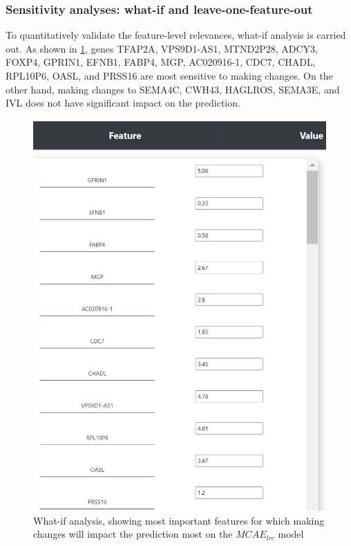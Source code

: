 \subsubsection{Sensitivity analyses: what-if and leave-one-feature-out}
To quantitatively validate the feature-level relevances, what-if analysis is carried out. As shown in \cref{fig:what_if}, genes TFAP2A, VPS9D1-AS1, MTND2P28, ADCY3, FOXP4, GPRIN1, EFNB1, FABP4, MGP, AC020916-1, CDC7, CHADL, RPL10P6, OASL, and PRSS16 are most sensitive to making changes. On the other hand, making changes to SEMA4C, CWH43, HAGLROS, SEMA3E, and IVL does not have significant impact on the prediction. 

\begin{figure}[h]
    \centering
	\includegraphics[scale=0.7]{images/what_if.png}
	\caption{What-if analysis, showing most important features for which making changes will impact the prediction most on the $MCAE_{lrc}$ model}
    \label{fig:what_if}
\end{figure}

